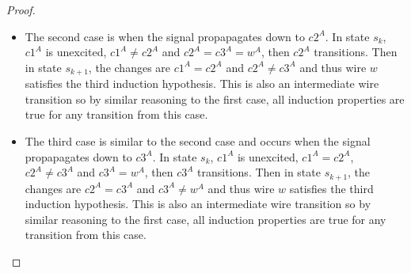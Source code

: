 \documentclass[12pt]{report}
\begin{document}
\begin{proof}
\begin{itemize}
\item The second case is when the signal propapagates down to $c2^A$.  In state $s_k$, $c1^A$ is unexcited, $c1^{A}\neq c2^{A}$ and $c2^A=c3^A=w^A$, then $c2^A$ transitions.  
Then in state $s_{k+1}$, the changes are $c1^A=c2^A$ and $c2^{A}\neq c3^{A}$ and thus wire $w$ satisfies the third induction hypothesis.  This is also an intermediate wire transition so by similar reasoning to the first case, all induction properties are true for any transition from this case.   
\item The third case is similar to the second case and occurs when the signal propapagates down to $c3^A$.  In state $s_k$, $c1^A$ is unexcited, $c1^A=c2^A$, $c2^{A}\neq c3^{A}$ and $c3^A=w^A$, then $c3^A$ transitions.  
Then in state $s_{k+1}$, the changes are $c2^A=c3^A$ and $c3^{A}\neq w^{A}$ and thus wire $w$ satisfies the third induction hypothesis.  This is also an intermediate wire transition so by similar reasoning to the first case, all induction properties are true for any transition from this case.   


\end{itemize}
\end{proof}
\end{document}
